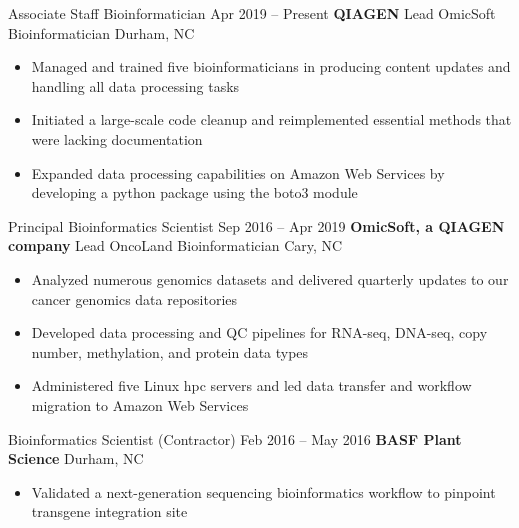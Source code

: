 
\begin{resentries}

  \resentrybeta
    {Associate Staff Bioinformatician}
    {Apr 2019 -- Present}
    {\textbf{QIAGEN}  \xspace \bullet \xspace \xspace Lead OmicSoft Bioinformatician} %
    {Durham, NC} %
    {
      \begin{itemize}[leftmargin=*, itemsep=-1.5mm] %
        \item{Managed and trained five bioinformaticians in producing content updates and handling all data processing tasks}
        \item{Initiated a large-scale code cleanup and reimplemented essential methods that were lacking documentation} 
        \item{Expanded data processing capabilities on Amazon Web Services by developing a python package using the boto3 module}
      \end{itemize}
    }

  \resentrybeta
    {Principal Bioinformatics Scientist}
    {Sep 2016 -- Apr 2019}
    {\textbf{OmicSoft, a QIAGEN company} \xspace \bullet \xspace \xspace Lead OncoLand Bioinformatician} %
    {Cary, NC} %
    {
      \begin{itemize}[leftmargin=*, itemsep=-1.5mm] %
        \item{Analyzed numerous genomics datasets and delivered quarterly updates to our cancer genomics data repositories}
        \item{Developed data processing and QC pipelines for RNA-seq, DNA-seq, copy number, methylation, and protein data types} 
        \item{Administered five Linux hpc servers and led data transfer and workflow migration to Amazon Web Services}
      \end{itemize}
    }

  \resentrybeta
    {Bioinformatics Scientist (Contractor)}
    {Feb 2016 -- May 2016}
    {\textbf{BASF Plant Science}}
    {Durham, NC}
    {
      \begin{itemize}[leftmargin=*, itemsep=-1.5mm] %
        \item{Validated a next-generation sequencing bioinformatics workflow to pinpoint transgene integration site}
      \end{itemize}
    }

\end{resentries}
